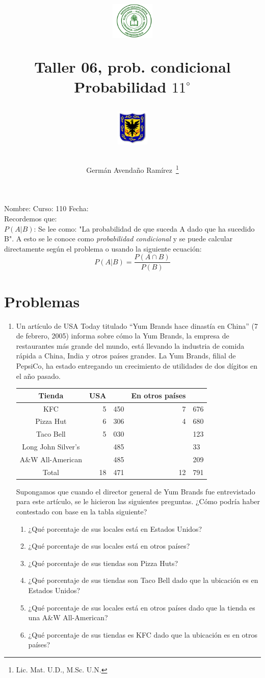 \documentclass[10pt,twoside]{article}
\author{Germ\'an Avenda\~no Ram\'irez~\thanks{Lic. Mat. U.D., M.Sc. U.N.}}
\title{\begin{minipage}{.2\textwidth}
\includegraphics[height=1.75cm]{Images/logo-colegio.png}\end{minipage}
\begin{minipage}{.55\textwidth}
\begin{center}
Taller 06, prob. condicional \\
Probabilidad $11^{\circ}$
\end{center}
\end{minipage}\hfill
\begin{minipage}{.2\textwidth}
\includegraphics[height=1.75cm]{Images/logo-sed.png} 
\end{minipage}}
\date{}
\begin{document}
\maketitle
Nombre: \hrulefill Curso: 110\underline{\hspace{12pt}}  Fecha: \underline{\hspace{2cm}}\\

Recordemos que:\\
$P(A|B)$: Se lee como: "La probabilidad de que suceda A dado que ha sucedido B". A esto se le conoce como \emph{probabilidad condicional} y se puede calcular directamente según el problema o usando la siguiente ecuación:
\[P(A|B)=\dfrac{P(A\cap B)}{P(B)} \]
\section*{Problemas}
\begin{enumerate}
\item Un artículo de USA Today titulado “Yum Brands hace dinastía en China” (7 de febrero, 2005) informa sobre cómo la Yum Brands, la empresa de restaurantes más grande del mundo, está llevando la industria de
comida rápida a China, India y otros países grandes. La Yum Brands, filial de PepsiCo, ha estado entregando un crecimiento de utilidades de dos dígitos en el año pasado.
\begin{center}
\begin{tabular}{|c|r@{\,}l|r@{\,}l|}
\hline 
Tienda & USA & & En otros países& \\ 
\hline 
KFC & 5&450 & 7&676 \\ 
Pizza Hut & 6&306 & 4&680 \\ 
Taco Bell & 5&030 & &123 \\ 
Long John Silver's & &485 & & \hspace*{5pt}33 \\ 
A\&W All-American & &485 & &209 \\ \hline
Total & 18&471 & 12&791 \\ 
\hline 
\end{tabular} 
\end{center}
Supongamos que cuando el director general de Yum Brands fue entrevistado para este artículo, se le hicieron las siguientes preguntas. ¿Cómo podría haber contestado con base en la tabla siguiente?
\begin{enumerate}
\item ¿Qué porcentaje de sus locales está en Estados
Unidos?
\item ¿Qué porcentaje de sus locales está en otros países?
\item ¿Qué porcentaje de sus tiendas son Pizza Huts?
\item ¿Qué porcentaje de sus tiendas son Taco Bell dado
que la ubicación es en Estados Unidos?
\item ¿Qué porcentaje de sus locales está en otros países dado que la tienda es una A\&W All-American?
\item ¿Qué porcentaje de sus tiendas es KFC dado que la ubicación es en otros países?
\end{enumerate}

\end{enumerate}
\end{document}
